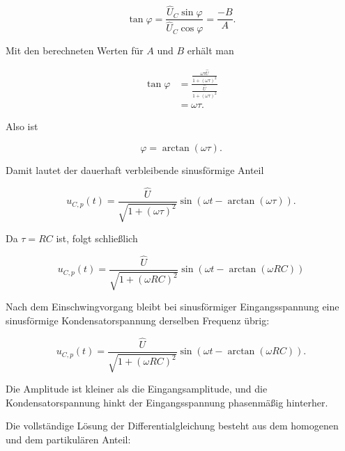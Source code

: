 \begin{equation}
	\tan\varphi
	=
	\frac{\hat{U}_C\sin\varphi}{\hat{U}_C\cos\varphi}
	=
	\frac{-B}{A}.
	\label{eq:rc-tangens-phase}
\end{equation}

Mit den berechneten Werten für \(A\) und \(B\) erhält man

\begin{align}
	\tan\varphi
	&=
	\frac{
		\frac{\omega\tau\hat{U}}{1+(\omega\tau)^2}
	}{
		\frac{\hat{U}}{1+(\omega\tau)^2}
	}
	\\[6pt]
	&=
	\omega\tau.
	\label{eq:rc-tangens-phase-omega-tau}
\end{align}

Also ist

\begin{equation}
	\varphi
	=
	\arctan(\omega\tau).
	\label{eq:rc-phase-stationaer}
\end{equation}

Damit lautet der dauerhaft verbleibende sinusförmige Anteil

\begin{equation}
	u_{C,p}(t)
	=
	\frac{\hat{U}}{\sqrt{1+(\omega\tau)^2}}
	\sin\left(
	\omega t
	-
	\arctan(\omega\tau)
	\right).
	\label{eq:rc-stationaerer-anteil-tau}
\end{equation}

Da \(\tau = RC\) ist, folgt schließlich

\begin{equation}
	\boxed{
		u_{C,p}(t)
		=
		\frac{\hat{U}}{\sqrt{1+(\omega RC)^2}}
		\sin\left(
		\omega t
		-
		\arctan(\omega RC)
		\right)
	}
	\label{eq:rc-stationaerer-anteil-rc}
\end{equation}

\begin{MathBox}
	\label{box:rc-dauerhaft-verbleibender-sinusanteil}
	Nach dem Einschwingvorgang bleibt bei sinusförmiger Eingangsspannung eine
	sinusförmige Kondensatorspannung derselben Frequenz übrig:
	
	\[
	u_{C,p}(t)
	=
	\frac{\hat{U}}{\sqrt{1+(\omega RC)^2}}
	\sin\left(
	\omega t
	-
	\arctan(\omega RC)
	\right).
	\]
	
	Die Amplitude ist kleiner als die Eingangsamplitude, und die
	Kondensatorspannung hinkt der Eingangsspannung phasenmäßig hinterher.
\end{MathBox}

Die vollständige Lösung der Differentialgleichung besteht aus dem homogenen
und dem partikulären Anteil:

